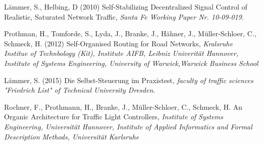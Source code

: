 \begin{thebibliography}{1}
    Lämmer, S., Helbing, D (2010) Self-Stabilizing Decentralized Signal Control of Realistic, Saturated Network Traffic, \emph{Santa Fe Working Paper Nr. 10-09-019.}
    
    Prothman, H., Tomforde, S., Lyda, J., Branke, J., H\"ahner, J., M\"uller-Schloer, C., Schmeck, H. (2012) Self-Organised Routing for Road Networks, \emph{Kralsruhe Institue of Technbology (Kit), Institute AIFB, Leibniz Univerit\"at Hannover, Institute of Systems Engineering, University of Warwick,Warwick Business School}
    
    L\"ammer, S. (2015) Die Selbst-Steuerung im Praxistest, \emph{faculty of traffic sciences "Friedrich List" of Technical University Dresden}.

    Rochner, F., Prothmann, H., Branke, J., M\"uller-Schloer, C., Schmeck, H. An Organic Architecture for Traffic Light Controllers, \emph{Institute of Systems Engineering, Universit\"at Hannover, Institute of Applied Informatics and Formal Description Methods, Universit\"at Karlsruhe}
    


\end{thebibliography}
